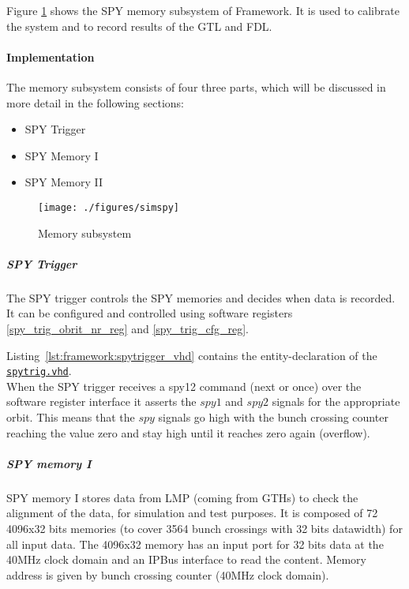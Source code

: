 Figure \ref{fig_simspy} shows the SPY memory subsystem of Framework.
It is used to calibrate the system and to record results of the GTL and FDL.

\paragraph{Implementation}\label{sec:framework:spy_impl}
The memory subsystem consists of four three parts, which will be discussed in more detail in the following sections:

\begin{itemize}
\item SPY Trigger
\item SPY Memory I
\item SPY Memory II
\end{itemize}

\begin{figure}[h]
\texttt{[image: ./figures/simspy]}
\caption{Memory subsystem}
\label{fig_simspy}
\end{figure}

\subparagraph{SPY Trigger}\label{sec:framework:spy_trigger}
The SPY trigger controls the SPY memories and decides when data is recorded. It can be configured and controlled using software registers \ref{spy_trig_obrit_nr_reg} and \ref{spy_trig_cfg_reg}.

Listing~\ref{lst:framework:spytrigger_vhd} contains the entity-declaration of the \href{https://github.com/cms-l1-globaltrigger/mp7_ugt_legacy/blob/master/firmware/hdl/payload/frame/spytrig.vhd}{\texttt{spytrig.vhd}}.\\



When the SPY trigger receives a spy12 command (next or once) over the software register interface it asserts the $spy1$ and $spy2$ signals for the appropriate orbit.
This means that the $spy$ signals go high with the bunch crossing counter reaching the value zero and stay high until it reaches zero again (overflow).

\subparagraph{SPY memory I}
SPY memory I stores data from LMP (coming from GTHs) to check the alignment of the data, for simulation and test purposes. It is composed of 72 4096x32 bits memories (to cover 3564 bunch crossings with 32 bits datawidth) for all input data. The 4096x32 memory has an input port for 32 bits data at the 40MHz clock domain and an IPBus interface to read the content. Memory address is given by bunch crossing counter (40MHz clock domain).

